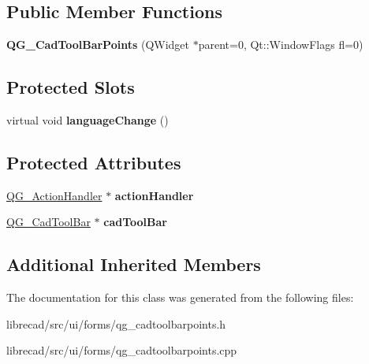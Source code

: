 \subsection*{Public Member Functions}
\begin{DoxyCompactItemize}
\item 
\hypertarget{classQG__CadToolBarPoints_a55dcd24135b0e07b76e72ec5a63b7118}{{\bfseries Q\-G\-\_\-\-Cad\-Tool\-Bar\-Points} (Q\-Widget $\ast$parent=0, Qt\-::\-Window\-Flags fl=0)}\label{classQG__CadToolBarPoints_a55dcd24135b0e07b76e72ec5a63b7118}

\end{DoxyCompactItemize}
\subsection*{Protected Slots}
\begin{DoxyCompactItemize}
\item 
\hypertarget{classQG__CadToolBarPoints_a28abd7ebcdb2ce70ab84669b6545bbd0}{virtual void {\bfseries language\-Change} ()}\label{classQG__CadToolBarPoints_a28abd7ebcdb2ce70ab84669b6545bbd0}

\end{DoxyCompactItemize}
\subsection*{Protected Attributes}
\begin{DoxyCompactItemize}
\item 
\hypertarget{classQG__CadToolBarPoints_a54552700c8dd57a432f04f9aff3eb907}{\hyperlink{classQG__ActionHandler}{Q\-G\-\_\-\-Action\-Handler} $\ast$ {\bfseries action\-Handler}}\label{classQG__CadToolBarPoints_a54552700c8dd57a432f04f9aff3eb907}

\item 
\hypertarget{classQG__CadToolBarPoints_a8b312783e4be5971652bd5ee890f3c9b}{\hyperlink{classQG__CadToolBar}{Q\-G\-\_\-\-Cad\-Tool\-Bar} $\ast$ {\bfseries cad\-Tool\-Bar}}\label{classQG__CadToolBarPoints_a8b312783e4be5971652bd5ee890f3c9b}

\end{DoxyCompactItemize}
\subsection*{Additional Inherited Members}


The documentation for this class was generated from the following files\-:\begin{DoxyCompactItemize}
\item 
librecad/src/ui/forms/qg\-\_\-cadtoolbarpoints.\-h\item 
librecad/src/ui/forms/qg\-\_\-cadtoolbarpoints.\-cpp\end{DoxyCompactItemize}
